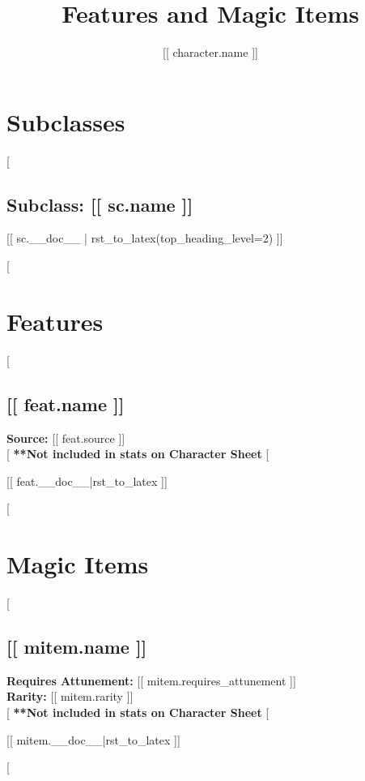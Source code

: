 \documentclass[10pt,twocolumn,lettersize]{article}
\title{Features and Magic Items}
\author{[[ character.name ]]}
\date{}
\begin{document}
\maketitle

\section*{Subclasses}
           
[%

  \subsection*{Subclass: [[ sc.name ]]}

  [[ sc.__doc__ | rst_to_latex(top_heading_level=2) ]]

[%
  
\section*{Features}

[%

  \subsection*{[[ feat.name ]]}

  \noindent
  \textbf{Source:} [[ feat.source ]] \\

  [%
    \textbf{**Not included in stats on Character Sheet} %
  [%
             
  [[ feat.__doc__|rst_to_latex ]]

[%

\section*{Magic Items}

[%

  \subsection*{[[ mitem.name ]]}

  \noindent
  \textbf{Requires Attunement:} [[ mitem.requires_attunement ]] \\
  \textbf{Rarity:} [[ mitem.rarity ]] \\

  [%
    \textbf{**Not included in stats on Character Sheet} %
  [%
             
  [[ mitem.__doc__|rst_to_latex ]]

  [%
    
\end{document}
